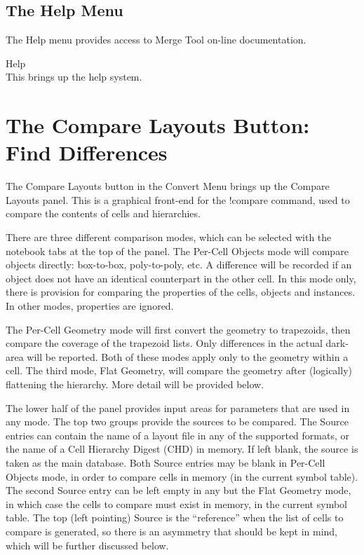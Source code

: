 \subsection{The Help Menu}

The {\cb Help} menu provides access to {\cb Merge Tool} on-line
documentation.

\begin{description}
\item{\cb Help}\\
This brings up the help system.
\end{description}


\section{The {\cb Compare Layouts} Button: Find Differences}
The {\cb Compare Layouts} button in the {\cb Convert Menu} brings up
the {\cb Compare Layouts} panel.  This is a graphical front-end for
the {\cb !compare} command, used to compare the contents of cells and
hierarchies.

There are three different comparison modes, which can be selected with
the notebook tabs at the top of the panel.  The {\cb Per-Cell Objects}
mode will compare objects directly:  box-to-box, poly-to-poly, etc.  A
difference will be recorded if an object does not have an identical
counterpart in the other cell.  In this mode only, there is provision
for comparing the properties of the cells, objects and instances.  In
other modes, properties are ignored.

The {\cb Per-Cell Geometry} mode will first convert the geometry to
trapezoids, then compare the coverage of the trapezoid lists.  Only
differences in the actual dark-area will be reported.  Both of these
modes apply only to the geometry within a cell.  The third mode, {\cb
Flat Geometry}, will compare the geometry after (logically) flattening
the hierarchy.  More detail will be provided below.

The lower half of the panel provides input areas for parameters that
are used in any mode.  The top two groups provide the sources to be
compared.  The {\cb Source} entries can contain the name of a layout
file in any of the supported formats, or the name of a Cell Hierarchy
Digest (CHD) in memory.  If left blank, the source is taken as the
main database.  Both {\cb Source} entries may be blank in {\cb
Per-Cell Objects} mode, in order to compare cells in memory (in the
current symbol table).  The second {\cb Source} entry can be left
empty in any but the {\cb Flat Geometry} mode, in which case the cells
to compare must exist in memory, in the current symbol table.  The top
(left pointing) {\cb Source} is the ``reference'' when the list of
cells to compare is generated, so there is an asymmetry that should be
kept in mind, which will be further discussed below.

